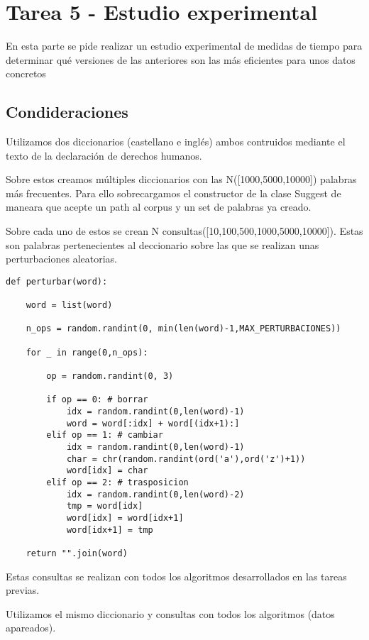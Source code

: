 \section{Tarea 5 - Estudio experimental}
En esta parte se pide realizar un estudio experimental de medidas de tiempo para determinar qué
versiones de las anteriores son las más eficientes para unos datos concretos
\subsection{Condideraciones}
Utilizamos dos diccionarios (castellano e inglés) ambos contruidos mediante el texto de la declaración de derechos humanos.

Sobre estos creamos múltiples diccionarios con las N([1000,5000,10000]) palabras más frecuentes. Para ello sobrecargamos el constructor de la clase Suggest de maneara que acepte un path al corpus y un set de palabras ya creado.

Sobre cada uno de estos se crean N consultas([10,100,500,1000,5000,10000]). Estas son palabras pertenecientes al deccionario sobre las que se realizan unas perturbaciones aleatorias.

\begin{lstlisting}[caption=Función para crear perturbaciones aleatorias]
def perturbar(word):

    word = list(word)

    n_ops = random.randint(0, min(len(word)-1,MAX_PERTURBACIONES))

    for _ in range(0,n_ops):

        op = random.randint(0, 3)

        if op == 0: # borrar
            idx = random.randint(0,len(word)-1)
            word = word[:idx] + word[(idx+1):]
        elif op == 1: # cambiar
            idx = random.randint(0,len(word)-1)
            char = chr(random.randint(ord('a'),ord('z')+1))
            word[idx] = char
        elif op == 2: # trasposicion
            idx = random.randint(0,len(word)-2)
            tmp = word[idx]
            word[idx] = word[idx+1]
            word[idx+1] = tmp

    return "".join(word)
\end{lstlisting}

Estas consultas se realizan con todos los algoritmos desarrollados en las tareas previas.

Utilizamos el mismo diccionario y consultas con todos los algoritmos (datos apareados).

